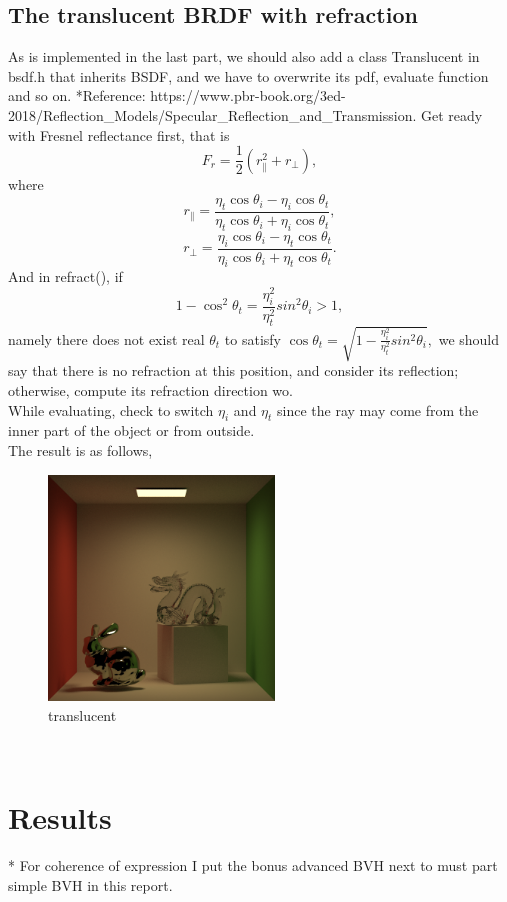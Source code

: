 \documentclass[acmtog]{acmart}
\begin{document}
\subsection{The translucent BRDF with refraction}
As is implemented in the last part, we should also add a class Translucent in bsdf.h that inherits BSDF, and we have to overwrite its pdf, evaluate function and so on. *Reference: https://www.pbr-book.org/3ed-2018/Reflection\_Models/Specular\_Reflection\_and\_Transmission.
Get ready with Fresnel reflectance first, that is $$F_r = \frac{1}{2}(r_{\parallel}^2+r_{\perp}),$$
where $$r_{\parallel}=\frac{\eta_t\cos\theta_i-\eta_i\cos\theta_t}{\eta_t\cos\theta_i+\eta_i\cos\theta_t},$$
$$r_{\perp}=\frac{\eta_i\cos\theta_i-\eta_t\cos\theta_t}{\eta_i\cos\theta_i+\eta_t\cos\theta_t}.$$
And in refract(), if $$1-\cos^2{\theta_t}=\frac{\eta_i^2}{\eta_t^2}sin^2{\theta_i}>1,$$
namely there does not exist real $\theta_t$ to satisfy $\cos{\theta_t}=\sqrt{1-\frac{\eta_i^2}{\eta_t^2}sin^2{\theta_i}},$ we should say that there is no refraction at this position, and consider its reflection; otherwise, compute its refraction direction wo.\\
While evaluating, check to switch $\eta_i$ and $\eta_t$ since the ray may come from the inner part of the object or from outside.\\
The result is as follows,
\begin{figure}[h]
	\includegraphics[width=6.0cm,height=6.0cm]{translucent.png}
	\caption{translucent}
\end{figure}\\
\section{Results}
* For coherence of expression I put the bonus advanced BVH next to must part simple BVH in this report.
\end{document}
